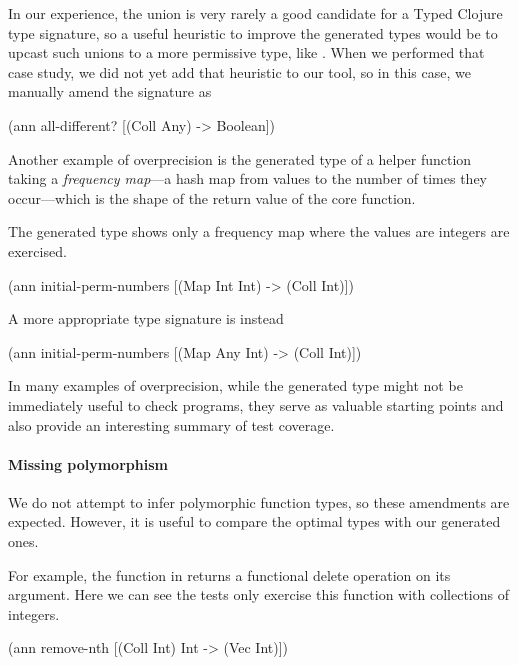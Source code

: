 In our experience, the union is very rarely a good candidate
for a Typed Clojure type signature, so a useful heuristic to improve
the generated types would be to upcast such unions to a more permissive
type, like .
When we performed that case study, we did not yet add that heuristic
to our tool,
so in this case, we manually amend the signature as

\begin{cljlisting}
(ann all-different? [(Coll Any) -> Boolean])
\end{cljlisting}

Another example of overprecision is the generated type
of  a helper function
taking a \emph{frequency map}---a hash map from values
to the number of times they occur---which is the shape
of the return value of the core 
function.

The generated type shows only a frequency map where
the values are integers are exercised.

\begin{cljlisting}
(ann initial-perm-numbers
  [(Map Int Int) -> (Coll Int)])
\end{cljlisting}

A more appropriate type signature is instead

\begin{cljlisting}
(ann initial-perm-numbers
  [(Map Any Int) -> (Coll Int)])
\end{cljlisting}

In many examples of overprecision, while the generated
type might not be immediately useful to check programs,
they serve as valuable starting points and also provide
an interesting summary of test coverage.

\paragraph{Missing polymorphism}

We do not attempt to infer polymorphic function types, 
so these amendments are expected. However, it is useful
to compare the optimal types with our generated ones.

For example, the  function in 
returns a functional delete operation on its argument.
Here we can see the tests only exercise this function with
collections of integers.

\begin{cljlisting}
(ann remove-nth [(Coll Int) Int -> (Vec Int)])
\end{cljlisting}

